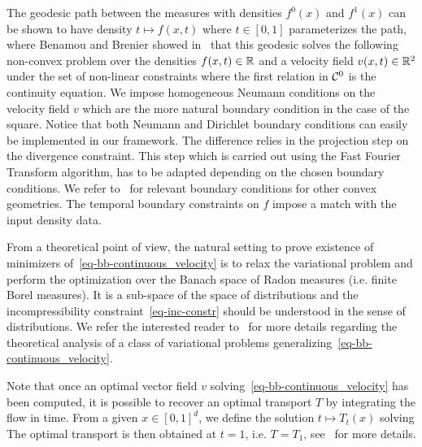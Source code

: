 The geodesic path between the measures with densities $f^0(x)$ and $f^1(x)$ can be shown to have density $t \mapsto f(x,t)$ where $t \in [0,1]$ parameterizes the path, where 
Benamou and Brenier showed in~\cite{Benamou2000} that this geodesic solves the following 
non-convex problem over the densities $f(x,t) \in \mathbb{R}$ and a velocity field $v(x,t) \in \mathbb{R}^2$
under the set of non-linear constraints
where the first relation in $\mathcal{C}^0$ is the continuity equation. We impose homogeneous Neumann conditions on the velocity field $v$ which are the more natural boundary condition in the case of the square. Notice that both Neumann and Dirichlet boundary conditions can easily be implemented in our framework. The difference relies in the projection step on the divergence constraint. This step which is carried out using the Fast Fourier Transform algorithm, has to be adapted depending on the chosen boundary conditions.  We refer to~\cite{Froese2012,Benamou2012} for relevant boundary conditions for other convex geometries. The temporal boundary constraints on $f$ impose a match with the input density data.

From a theoretical point of view, the natural setting to prove existence of minimizers of~\eqref{eq-bb-continuous_velocity} is to relax the variational problem and perform the optimization over the Banach space of Radon measures (i.e. finite Borel measures). It is a sub-space of the space of distributions and the incompressibility constraint~\eqref{eq-inc-constr} should be understood in the sense of distributions. We refer the interested reader to~\cite{Cardaliaguet2012} for more details regarding the theoretical analysis of a class of variational problems generalizing~\eqref{eq-bb-continuous_velocity}.  

Note that once an optimal vector field $v$ solving~\eqref{eq-bb-continuous_velocity} has been computed, it is possible to recover an optimal transport $T$ by integrating the flow in time. From a given $x \in [0,1]^d$, we define the solution $t \mapsto T_t(x)$ solving 
The optimal transport is then obtained at $t=1$, i.e. $T = T_1$, see~\cite{Benamou2000} for more details. 

